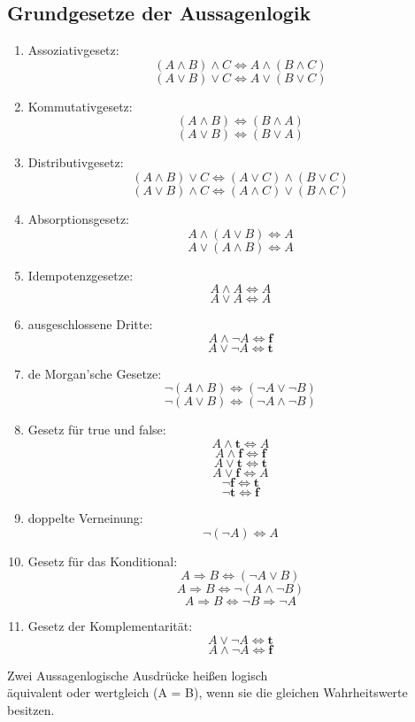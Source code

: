 \documentclass[../ana1u.tex]{subfiles}
\begin{document}
\subsection{Grundgesetze der Aussagenlogik}
\begin{enumerate}
    \item Assoziativgesetz:
    \[(A \wedge B) \wedge C \Leftrightarrow A \wedge (B \wedge C)\]
    \[(A \vee B) \vee C \Leftrightarrow A \vee (B \vee C)\]
    \item Kommutativgesetz:
    \[(A \wedge B) \Leftrightarrow (B \wedge A)\]
    \[(A \vee B) \Leftrightarrow (B \vee A)\]
    \item Distributivgesetz:
    \[(A \wedge B) \vee C \Leftrightarrow (A \vee C) \wedge (B \vee C)\]
    \[(A \vee B) \wedge C \Leftrightarrow (A \wedge C) \vee (B \wedge C)\]
    \item Absorptionsgesetz:
    \[A \wedge (A \vee B) \Leftrightarrow A\]
    \[A \vee (A \wedge B) \Leftrightarrow A\]
    \item Idempotenzgesetze:
    \[A \wedge A \Leftrightarrow A\]
    \[A \vee A \Leftrightarrow A\]
    \item ausgeschlossene Dritte:
    \[A \wedge \neg A \Leftrightarrow \textbf{f}\]
    \[A \vee \neg A \Leftrightarrow \textbf{t}\]
    \item de Morgan'sche Gesetze:
    \[\neg (A \wedge B) \Leftrightarrow (\neg A \vee \neg B)\]
    \[\neg (A \vee B) \Leftrightarrow (\neg A \wedge \neg B)\]
    \item Gesetz für true und false:
    \[A \wedge \textbf{t} \Leftrightarrow A\]
    \[A \wedge \textbf{f} \Leftrightarrow \textbf{f}\]
    \[A \vee \textbf{t} \Leftrightarrow \textbf{t}\]
    \[A \vee \textbf{f} \Leftrightarrow A\]
    \[\neg \textbf{f} \Leftrightarrow \textbf{t}\]
    \[\neg \textbf{t} \Leftrightarrow \textbf{f}\]
    \item doppelte Verneinung:
    \[\neg (\neg A) \Leftrightarrow A\]
    \item Gesetz für das Konditional:
    \[A \Rightarrow B \Leftrightarrow (\neg A \vee B)\]
    \[A \Rightarrow B \Leftrightarrow \neg (A \wedge \neg B)\]
    \[A \Rightarrow B \Leftrightarrow \neg B \Rightarrow \neg A\]
    \item Gesetz der Komplementarität:
    \[A \vee \neg A \Leftrightarrow \textbf{t}\]
    \[A \wedge \neg A \Leftrightarrow \textbf{f}\]
\end{enumerate}	
\begin{defi}
    Zwei Aussagenlogische Ausdrücke heißen logisch \\ 
    äquivalent oder wertgleich (A = B), wenn sie die gleichen Wahrheitswerte besitzen.
\end{defi}
\end{document}

